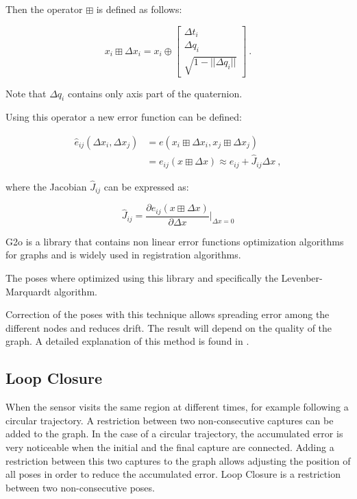 Then the operator $\boxplus$ is defined as follows:

$$
x_i \boxplus \Delta x_i = x_i \oplus \begin{bmatrix} \Delta t_i \\ \Delta q_i \\ \sqrt{1-||\Delta q_i||}  \end{bmatrix} \ .
$$

Note that $\Delta q_i$ contains only axis part of the quaternion.

Using this operator a new error function can be defined:

\begin{equation}
\begin{aligned}
\hat{e}_{ij}(\Delta x_i,\Delta x_j) &= e(x_i \boxplus \Delta x_i,x_j \boxplus \Delta x_j) \\
&= e_{ij}(x \boxplus \Delta x) \approx e_{ij} + \hat{J}_{ij} \Delta x \ ,
\end{aligned}
\end{equation}

\noindent where the Jacobian $\hat{J}_{ij}$ can be expressed as:

$$
\hat{J}_{ij} = \frac{\partial{e_{ij}(x \boxplus \Delta x)}}{\partial{\Delta x}} \bigg|_{\Delta x=0}
$$


G2o is a library that contains non linear error functions optimization 
algorithms for graphs and is widely used in registration algorithms. 

The poses where optimized using this library and specifically the 
Levenber-Marquardt algorithm.

Correction of the poses with this technique allows spreading error among the different nodes and reduces drift. The result 
will depend on the quality of the graph. A detailed explanation of this method is found in \cite{g2o}.

\subsection{Loop Closure}

When the sensor visits the same region at different times, for example following 
a circular trajectory. A restriction between two non-consecutive captures can be 
added to the graph. In the case of a circular trajectory, the accumulated error 
is very noticeable when the initial and the final capture are connected. Adding a 
restriction between this two captures to the graph allows adjusting 
the position of all poses in order to reduce the accumulated error. Loop Closure is 
a restriction between two non-consecutive poses.


